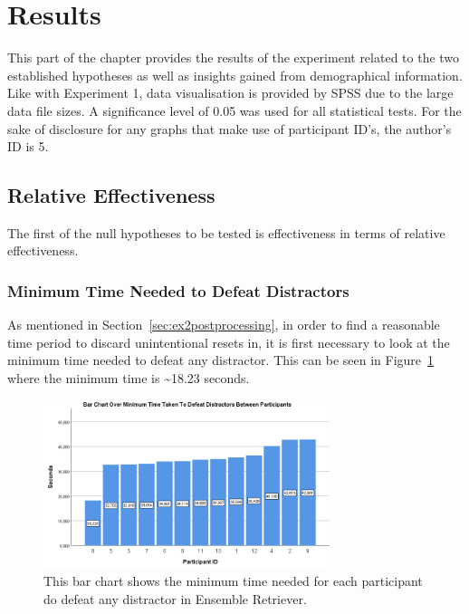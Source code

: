 \section{Results}
This part of the chapter provides the results of the experiment related to the two established hypotheses as well as insights gained from demographical information. Like with Experiment 1, data visualisation is provided by SPSS due to the large data file sizes. A significance level of 0.05 was used for all statistical tests. For the sake of disclosure for any graphs that make use of participant ID's, the author's ID is 5. 

\subsection{Relative Effectiveness}
The first of the null hypotheses to be tested is effectiveness in terms of relative effectiveness. 

\subsubsection{Minimum Time Needed to Defeat Distractors}
As mentioned in Section~\ref{sec:ex2postprocessing}, in order to find a reasonable time period to discard unintentional resets in, it is first necessary to look at the minimum time needed to defeat any distractor. This can be seen in Figure~\ref{fig:minDistractorDefeatTime} where the minimum time is \textasciitilde18.23 seconds.

\begin{figure}[tbph]
    \centering
    \includegraphics[width=0.75\textwidth]{figures/graphs/MinDistractorDefeatTime.png}
    \caption[Minimum Time Needed To Defeat Distractors Between Participants]{This bar chart shows the minimum time needed for each participant do defeat any distractor in Ensemble Retriever.}
    \label{fig:minDistractorDefeatTime}
\end{figure}

